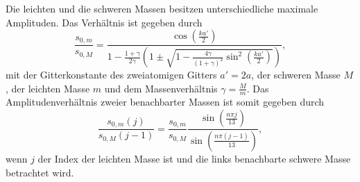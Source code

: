 Die leichten und die schweren Massen besitzen unterschiedliche maximale Amplituden. Das Verhältnis ist gegeben durch \cite{Litmap}
\begin{equation}
 \frac{s_{0,m}}{s_{0,M}} = \frac{\cos\left(\frac{ka'}{2}\right)}{1-\frac{1+\gamma}{2\gamma}\left(1\pm\sqrt{1-\frac{4\gamma}{(1+\gamma)^{2}}\sin^{2}\left(\frac{ka'}{2}\right)}\right)},
\end{equation}
mit der Gitterkonstante des zweiatomigen Gitters $a'=2a$, der schweren Masse $M$, der leichten Masse $m$ und dem Massenverhältnis $\gamma=\frac{M}{m}$.
Das Amplitudenverhältnis zweier benachbarter Massen ist somit gegeben durch
\begin{equation}
 \frac{s_{0,m}(j)}{s_{0,M}(j-1)} = \frac{s_{0,m}}{s_{0,M}} \frac{\sin\left(\frac{n\pi j}{13}\right)}{\sin\left(\frac{n\pi (j-1)}{13}\right)},
\end{equation}
wenn $j$ der Index der leichten Masse ist und die links benachbarte schwere Masse betrachtet wird.














